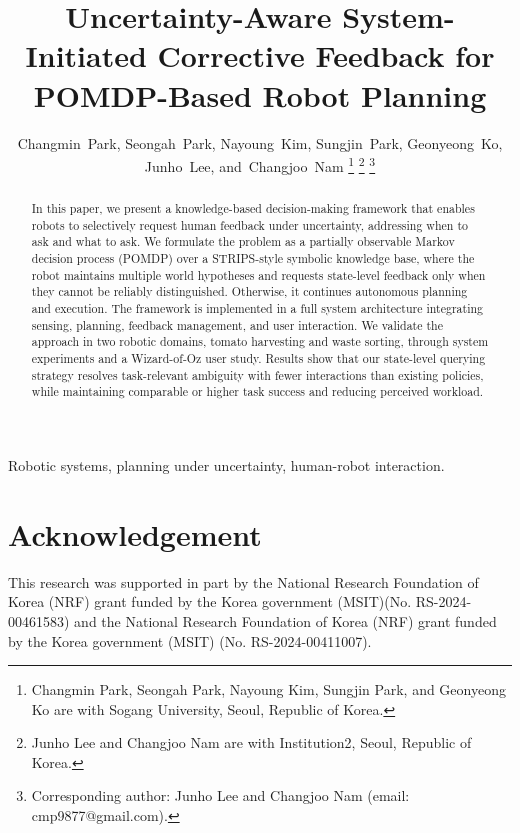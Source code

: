 \documentclass[journal]{IEEEtran}
\begin{document}
\title{Uncertainty-Aware System-Initiated Corrective Feedback for POMDP-Based Robot Planning}

\author{Changmin~Park,
        Seongah~Park,
        Nayoung~Kim,
        Sungjin~Park,
        Geonyeong~Ko,
        Junho~Lee,
        and~Changjoo~Nam%
\thanks{Changmin Park, Seongah Park, Nayoung Kim, Sungjin Park, and Geonyeong Ko are with Sogang University, Seoul, Republic of Korea.}%
\thanks{Junho Lee and Changjoo Nam are with Institution2, Seoul, Republic of Korea.}%
\thanks{Corresponding author: Junho Lee and Changjoo Nam (email: cmp9877@gmail.com).}}

\maketitle

\begin{abstract}
In this paper, we present a knowledge-based decision-making framework that enables robots to selectively request human feedback under uncertainty, addressing when to ask and what to ask. We formulate the problem as a partially observable Markov decision process (POMDP) over a STRIPS-style symbolic knowledge base, where the robot maintains multiple world hypotheses and requests state-level feedback only when they cannot be reliably distinguished. Otherwise, it continues autonomous planning and execution. The framework is implemented in a full system architecture integrating sensing, planning, feedback management, and user interaction. We validate the approach in two robotic domains, tomato harvesting and waste sorting, through system experiments and a Wizard-of-Oz user study. Results show that our state-level querying strategy resolves task-relevant ambiguity with fewer interactions than existing policies, while maintaining comparable or higher task success and reducing perceived workload.
\end{abstract}


\begin{IEEEkeywords}
Robotic systems, planning under uncertainty, human-robot interaction.
\end{IEEEkeywords}











\section*{Acknowledgement}
This research was supported in part by the National Research Foundation of Korea (NRF) grant funded by the Korea government (MSIT)(No. RS-2024-00461583) and the National Research Foundation of Korea (NRF) grant funded by the Korea government (MSIT) (No. RS-2024-00411007).





\newpage
\onecolumn

\appendices





\end{document}
